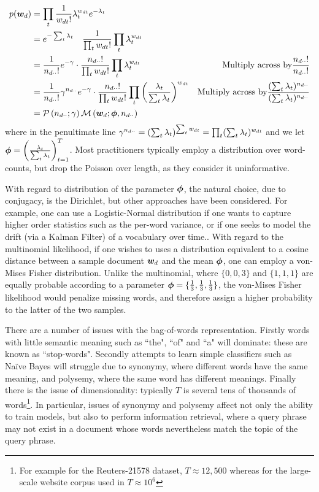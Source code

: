 \begin{align*}
p({ \bm w_d }) & = \prod_t \frac{1}{ {{ w_{dt} }!} } \lambda_t^{ w_{dt} } e^{-\lambda_t} \\
 &= e^{-\sum_t \lambda_t} \quad \frac{1}{ {\prod_t { w_{dt} }!} } \prod_t \lambda_t^{ w_{dt} } \\
&= \frac{1}{ {{ n_{d\cdot\cdot} } !} } e^{-\gamma} \cdot  \frac{{ n_{d\cdot\cdot} } !}{\prod_t { w_{dt} }!} \prod_t \lambda_t^{ w_{dt} } & \text{Multiply across by}\frac{{ n_{d\cdot\cdot} }!}{{ n_{d\cdot\cdot} }!} \\
&= \frac{1}{ {{ n_{d\cdot\cdot} } !} } \gamma^{ n_{d\cdot\cdot} } e^{-\gamma} \cdot  \frac{{ n_{d\cdot\cdot} } !}{\prod_t { w_{dt} }!} \prod_t \left(\frac{\lambda_t}{\sum_t \lambda_t}\right)^{ w_{dt} } & \text{Multiply across by}\frac{(\sum_t \lambda_t)^{ n_{d\cdot\cdot} }}{(\sum_t \lambda_t)^{ n_{d\cdot\cdot} }} \\
&= \mathcal{P}\left({ n_{d\cdot\cdot} }; \gamma\right) \mathcal{M}\left({ \bm w_d }; \bm \phi, { n_{d\cdot\cdot} }\right)
\end{align*}
where in the penultimate line $\gamma^{ n_{d\cdot\cdot} } = (\sum_t \lambda_t)^{\sum_t { w_{dt} }} = \prod_t (\sum_t \lambda_t)^{ w_{dt} }$ and we let $\bm \phi = \left(\frac{\lambda_t}{\sum_t \lambda_t}\right)_{t=1}^T$. Most practitioners typically employ a distribution over word-counts, but drop the Poisson over length, as they consider it uninformative.

With regard to distribution of the parameter $\bm \phi$, the natural choice, due to conjugacy, is the Dirichlet, but other approaches have been considered. For example, one can use a Logistic-Normal distribution if one wants to capture higher order statistics such as the per-word variance, or if one seeks to model the drift (via a Kalman Filter) of a vocabulary over time.\cite{Blei2006a}. With regard to the multinomial likelihood, if one wishes to uses a distribution equivalent to a cosine distance between a sample document ${ \bm w_d }$ and the mean $\bm \phi$, one can employ a von-Mises Fisher distribution\cite{Reisinger2010}. Unlike the multinomial, where $\{0, 0, 3\}$ and $\{1, 1, 1\}$ are equally probable according to a parameter $\bm \phi = \{\frac{1}{ {3} }, \frac{1}{ {3} }, \frac{1}{ {3} }\}$, the von-Mises Fisher likelihood would penalize missing words, and therefore assign a higher probability to the latter of the two samples.

There are a number of issues with the bag-of-words representation. Firstly words with little semantic meaning such as ``the", ``of" and ``a" will dominate: these are known as ``stop-words". Secondly attempts to learn simple classifiers such as Na\"ive Bayes\cite{Nigam2000} will struggle due to synonymy, where different words have the same meaning, and polysemy, where the same word has different meanings. Finally there is the issue of dimensionality: typically $T$ is several tens of thousands of words\footnote{For example for the Reuters-21578 dataset, $T\approx 12,500$ whereas for the large-scale website corpus used in\cite{Smola2010} $T \approx 10^6$}. In particular, issues of synonymy and polysemy affect not only the ability to train models, but also to perform information retrieval, where a query phrase may not exist in a document whose words nevertheless match the topic of the query phrase.

